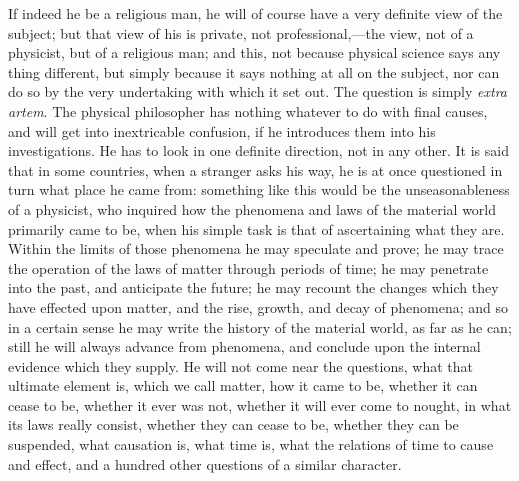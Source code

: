 If indeed he be a religious man, he will of course have a very
definite view of the subject; but that view of his is private, not
professional,—the view, not of a physicist, but of a religious man;
and this, not because physical science says any thing different, but
simply because it says nothing at all on the subject, nor can do so by
the very undertaking with which it set out. The question is simply \emph{extra
artem}. The physical philosopher has nothing whatever to do with
final causes, and will get into inextricable confusion, if he
introduces them into his investigations. He has to look in one
definite direction, not in any other. It is said that in some
countries, when a stranger asks his way, he is at once questioned in
turn what place he came from: something like this would be the
unseasonableness of a physicist, who inquired how the phenomena and
laws of the material world primarily came to be, when his simple task
is that of ascertaining what they are. Within the limits of those
phenomena he may speculate and prove; he may trace the operation of
the laws of matter through periods of time; he may penetrate into the
past, and anticipate the future; he may recount the changes which they
have effected upon matter, and the rise, growth, and decay of
phenomena; and so in a certain sense he may write the history of the
material world, as far as he can; still he will always advance from
phenomena, and conclude upon the internal evidence which they supply.
He will not come near the questions, what that ultimate element is,
which we call matter, how it came to be, whether it can cease to be,
whether it ever was not, whether it will ever come to nought, in
what its laws really consist, whether they can cease to be, whether
they can be suspended, what causation is, what time is, what the
relations of time to cause and effect, and a hundred other questions
of a similar character.

